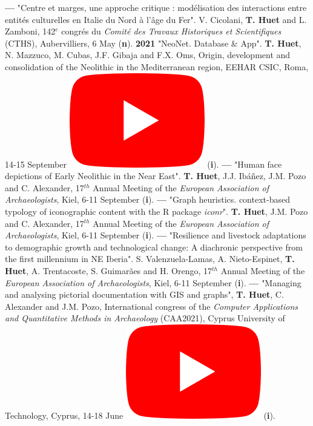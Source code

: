 \documentclass{article}
\begin{document}
\textbf{--- }"Centre et marges, une approche critique : modélisation des interactions entre entités culturelles en Italie du Nord à l'âge du Fer". V. Cicolani, \textbf{T. Huet} and L. Zamboni, 142${}^{e}$ congr\'{e}s du \textit{Comit\'{e} des Travaux Historiques et Scientifiques} (CTHS), Aubervilliers, 6 May (\textbf{n}).
\smallbreak
\textbf{2021 }"NeoNet. Database \& App". \textbf{T. Huet}, N. Mazzuco, M. Cubas, J.F. Gibaja and F.X. Oms, Origin, development and consolidation of the Neolithic in the Mediterranean region, EEHAR CSIC, Roma, 14-15 September \href{https://youtu.be/GM2niot0XwE?t=10700}{\includegraphics[scale=0.2]{icon_youtube}} (\textbf{i}).
\smallbreak
\textbf{--- }"Human face depictions of Early Neolithic in the Near East". \textbf{T. Huet}, J.J. Ibáñez, J.M. Pozo and C. Alexander, 17${}^{th}$ Annual Meeting of the \textit{European Association of Archaeologists}, Kiel, 6-11 September (\textbf{i}).
\smallbreak
\textbf{--- }"Graph heuristics. context-based typology of iconographic content with the R package \textit{iconr}". \textbf{T. Huet}, J.M. Pozo and C. Alexander, 17${}^{th}$ Annual Meeting of the \textit{European Association of Archaeologists}, Kiel, 6-11 September (\textbf{i}).
\smallbreak
\textbf{--- }"Resilience and livestock adaptations to demographic growth and technological change: A diachronic perspective from the first millennium in NE Iberia". S. Valenzuela-Lamas, A. Nieto-Espinet, \textbf{T. Huet}, A. Trentacoste, S. Guimarães and H. Orengo, 17${}^{th}$ Annual Meeting of the \textit{European Association of Archaeologists}, Kiel, 6-11 September (\textbf{i}).
\smallbreak
\textbf{--- }"Managing and analysing pictorial documentation with GIS and graphs", \textbf{T. Huet}, C. Alexander and J.M. Pozo, International congress of the \textit{Computer Applications and Quantitative Methods in Archaeology} (CAA2021), Cyprus University of Technology, Cyprus, 14-18 June \href{https://youtu.be/tUhHhzGSgbk?t=4950}{\includegraphics[scale=0.2]{icon_youtube}} (\textbf{i}).
\end{document}
